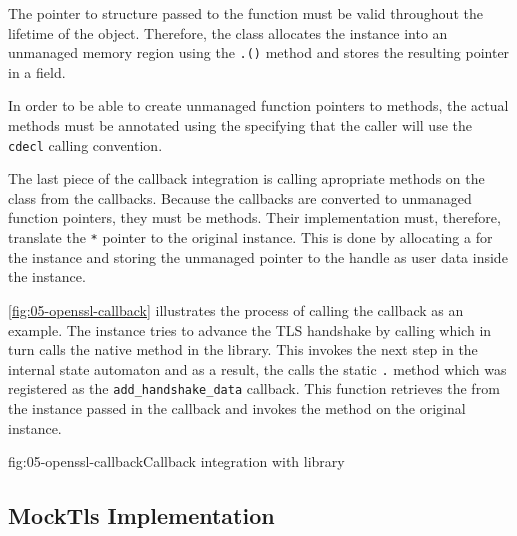 The pointer to  structure passed to the 
function must be valid throughout the lifetime of the \SSLCTX{} object. Therefore, the \OpenSslTls{}
class allocates the  instance into an unmanaged memory region using the
\texttt{.()} method and stores the resulting pointer in a
 field.

In order to be able to create unmanaged function pointers to \csharp{} methods, the actual methods
must be annotated using the  specifying that the caller will
use the \texttt{cdecl} calling convention.

The last piece of the \libopenssl{} callback integration is calling apropriate methods on the
\ManagedQuicConnection{} class from the callbacks. Because the callbacks are converted to unmanaged
function pointers, they must be  methods. Their implementation must, therefore,
translate the \texttt{\SSL{}*} pointer to the original \OpenSslTls{} instance. This is done by
allocating a  for the \OpenSslTls{} instance and storing the unmanaged pointer to
the handle as user data inside the \SSL{} instance.

\autoref{fig:05-openssl-callback} illustrates the process of calling the 
callback as an example. The \ManagedQuicConnection{} instance tries to advance the TLS handshake by
calling  which in turn calls the  native method
in the \libopenssl{} library. This invokes the next step in the internal state automaton and as a
result, the \libopenssl{} calls the static \texttt{\OpenSslTls{}.} method
which was registered as the \texttt{add_handshake_data} callback. This function retrieves the
 from the \SSL{} instance passed in the callback and invokes the
 method on the original \ManagedQuicConnection{} instance.

\begin{myFigure}{fig:05-openssl-callback}{Callback integration with \libopenssl{} library}

  \resizebox{\linewidth}{!}{}

\end{myFigure}

\subsection{MockTls Implementation}

